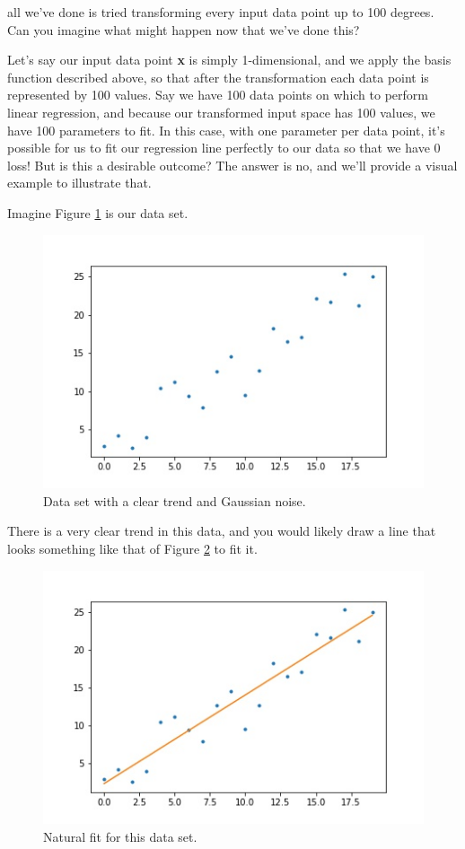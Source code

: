 all we've done is tried transforming every input data point up to 100 degrees. Can you imagine what might happen now that we've done this?

Let's say our input data point \textbf{x} is simply 1-dimensional, and we apply the basis function described above, so that after the transformation each data point is represented by 100 values. Say we have 100 data points on which to perform linear regression, and because our transformed input space has 100 values, we have 100 parameters to fit. In this case, with one parameter per data point, it's possible for us to fit our regression line perfectly to our data so that we have 0 loss! But is this a desirable outcome? The answer is no, and we'll provide a visual example to illustrate that.

Imagine Figure \ref{fig:data-set-scattered} is our data set.

\begin{figure}
    \centering
    \includegraphics[width=0.5\paperwidth]{../LinearRegression/fig/data_set_scattered_GEN.jpg}
    \caption{Data set with a clear trend and Gaussian noise.}
    \label{fig:data-set-scattered}
\end{figure}

There is a very clear trend in this data, and you would likely draw a line that looks something like that of Figure \ref{fig:data-set-natural-fit} to fit it.

\begin{figure}
    \centering
    \includegraphics[width=0.5\paperwidth]{../LinearRegression/fig/data_set_natural_fit_GEN.jpg}
    \caption{Natural fit for this data set.}
    \label{fig:data-set-natural-fit}
\end{figure}

